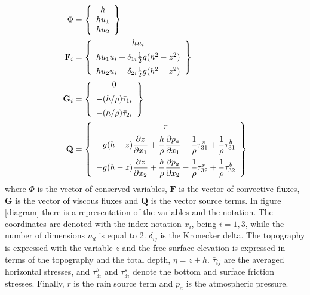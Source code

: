 \documentclass[a4paper,12pt]{article}
\newcommand\Ignasi[1]{\ifthenelse{\boolean{show_comments}}{\textcolor{blue}{#1}}{}}
\newcommand{\pder}[2]{\frac{\partial#1}{\partial#2}}
\begin{document}
\begin{subequations}\label{variables_and_fluxes}
\allowdisplaybreaks
\begin{align}
\Phi &= \left\{
    \begin{array}{c}
        h \\
        hu_1 \\
        hu_2
    \end{array}\right\} \\
\mathbf{F}_i &= \left\{
    \begin{array}{c}
        hu_i \\ [5pt]
        hu_1u_i + \delta_{1i}\frac{1}{2}g(h^2 - z^2) \\ [5pt]
        hu_2u_i + \delta_{2i}\frac{1}{2}g(h^2 - z^2)
    \end{array}\right\} \\
\mathbf{G}_i &= \left\{
    \begin{array}{c}
        0 \\ [5pt]
        -(h/\rho) \bar{\tau}_{1i} \\ [5pt]
        -(h/\rho) \bar{\tau}_{2i}
    \end{array}\right\} \\
\mathbf{Q} &= \left\{
    \begin{array}{c}
        r \\ [5pt]
        \displaystyle -g(h-z)\pder{z}{x_1} + \frac{h}{\rho}\pder{p_a}{x_1}
        - \frac{1}{\rho}\tau^s_{31} + \frac{1}{\rho}\tau^b_{31} \\ [10pt]
        \displaystyle -g(h-z)\pder{z}{x_2} + \frac{h}{\rho}\pder{p_a}{x_2}
        - \frac{1}{\rho}\tau^s_{32} + \frac{1}{\rho}\tau^b_{32}
    \end{array}\right\}
\end{align}
\end{subequations}
where $\Phi$ is the vector of conserved variables, $\mathbf{F}$ is the vector of convective fluxes, $\mathbf{G}$ is the vector of viscous fluxes and $\mathbf{Q}$ is the vector source terms. In figure \ref{diagram} there is a representation of the variables and the notation. The coordinates are denoted with the index notation $x_i$, being $i=1,3$, while the number of dimensions $n_d$ is equal to 2. $\delta_{ij}$ is the Kronecker delta. The topography is expressed with the variable $z$ and the free surface elevation is expressed in terms of the topography and the total depth, $\eta = z + h$. $\bar{\tau}_{ij}$ are the averaged horizontal stresses, and $\tau^b_{3i}$ and $\tau^s_{3i}$ denote the bottom and surface friction stresses. Finally, $r$ is the rain source term and $p_a$ is the atmospheric pressure.
\Ignasi{AQUI HAURIES DE DEFINIR TOTES LES VARIABLES QUE ESTAS INTRODUINT A LES EQUACIONS 1 I 2, I EL SIGNIFICAT DE CADA EQUACIO (BALANÇ DE MASSA, MOMENT O EL QUE SIGUI). TAMBÉ HAURIES D'INDICAR D'ALGUNA MANERA FACIL QUE i ÉS CADA COMPONENT DE LES DUES DIMENSIONS AMB QUE MODELES EL DOMINI (TOT I QUE ARA S'ENTEN, EL PRIMER COP QUE HO HE LLEGIT M'HA SEMBLAT CONFUS)}
\end{document}
